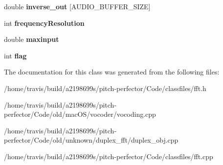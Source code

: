 \begin{DoxyCompactItemize}
\item 
\hypertarget{classfft_a290d4177db41a835118d5e0003ec7e2f}{double {\bfseries inverse\-\_\-out} \mbox{[}A\-U\-D\-I\-O\-\_\-\-B\-U\-F\-F\-E\-R\-\_\-\-S\-I\-Z\-E\mbox{]}}\label{classfft_a290d4177db41a835118d5e0003ec7e2f}

\item 
\hypertarget{classfft_ae744c22f8e06bdd1a3fc471bcff821a4}{int {\bfseries frequency\-Resolution}}\label{classfft_ae744c22f8e06bdd1a3fc471bcff821a4}

\item 
\hypertarget{classfft_a01978c3e238491e7b8ecd75340e0ca3c}{double {\bfseries maxinput}}\label{classfft_a01978c3e238491e7b8ecd75340e0ca3c}

\item 
\hypertarget{classfft_a66afecdbae4bef314698644fc3f280de}{int {\bfseries flag}}\label{classfft_a66afecdbae4bef314698644fc3f280de}

\end{DoxyCompactItemize}


The documentation for this class was generated from the following files\-:\begin{DoxyCompactItemize}
\item 
/home/travis/build/a2198699s/pitch-\/perfector/\-Code/classfiles/fft.\-h\item 
/home/travis/build/a2198699s/pitch-\/perfector/\-Code/old/mac\-O\-S/vocoder/vocoding.\-cpp\item 
/home/travis/build/a2198699s/pitch-\/perfector/\-Code/old/unknown/duplex\-\_\-fft/duplex\-\_\-obj.\-cpp\item 
/home/travis/build/a2198699s/pitch-\/perfector/\-Code/classfiles/fft.\-cpp\end{DoxyCompactItemize}
